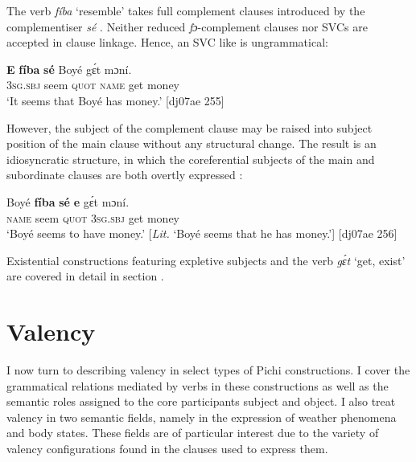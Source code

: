 The verb \textit{fíba} ‘resemble’ takes full complement clauses introduced by the complementiser \textit{sé} . Neither reduced \textit{fɔ}{}-complement clauses nor SVCs are accepted in clause linkage. Hence, an SVC like  is ungrammatical:


\ea%
    \label{ex:key:1154}
    \gll \textbf{E}    \textbf{fíba}    \textbf{sé}    Boyé  gɛ́t  mɔní.\\
\textsc{3sg.sbj}  seem  \textsc{quot}    \textsc{name}  get  money\\

\glt ‘It seems that Boyé has money.’ [dj07ae 255]
\z


\z

However, the subject of the complement clause may be raised into subject position of the main clause without any structural change. The result is an idiosyncratic structure, in which the coreferential subjects of the main and subordinate clauses are both overtly expressed :


\ea%
    \label{ex:key:1156}
    \gll Boyé  \textbf{fíba}    \textbf{sé}    \textbf{e}    gɛ́t  mɔní.\\
\textsc{name}  seem  \textsc{quot}    \textsc{3sg.sbj}  get  money\\

\glt ‘Boyé seems to have money.’ [\textit{Lit.} ‘Boyé seems that he has money.’] [dj07ae 256]
\z

Existential constructions featuring expletive subjects and the verb \textit{gɛ́t} ‘get, exist’ are covered in detail in section .

\section{Valency}\label{sec:9.3}

I now turn to describing valency in select types of Pichi constructions. I cover the grammatical relations mediated by verbs in these constructions as well as the semantic roles assigned to the core participants subject and object. I also treat valency in two semantic fields, namely in the expression of weather phenomena and body states. These fields are of particular interest due to the variety of valency configurations found in the clauses used to express them.


